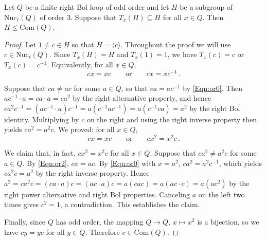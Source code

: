 \documentclass[10pt,a4paper]{amsart}
\newcommand{\com}[1]{\mathrm{Com}(#1)}
\newcommand{\inv}{^{-1}}
\newcommand{\lnuc}[1]{\mathrm{Nuc}_\ell(#1)}
\begin{document}
\begin{lemma}\label{Lem:rnuccomm}
Let $Q$ be a finite right Bol loop of odd order and let $H$ be a subgroup of $\lnuc{Q}$ of order $3$. Suppose that $T_x(H)\subseteq H$ for all $x\in Q$. Then $H\leq \com{Q}$.
\end{lemma}

\begin{proof}
Let $1\ne c\in H$ so that $H = \langle c\rangle$. Throughout the proof we will use $c\in\lnuc{Q}$. Since $T_x(H)=H$ and $T_x(1)=1$, we have $T_x(c) = c$ or $T_x(c) = c\inv$. Equivalently, for all $x\in Q$,
\begin{equation}\label{Eqn:or0}
	cx = xc\qquad\text{or}\qquad cx=xc\inv\,.
\end{equation}

Suppose that $ca\neq ac$ for some $a\in Q$, so that $ca=ac\inv$ by \eqref{Eqn:or0}. Then $ac\inv\cdot a = ca\cdot a = ca^2$ by the right alternative property, and hence $ca^2c\inv = (ac\inv\cdot a)c\inv = a(c\inv ac\inv) = a(c\inv ca) = a^2$ by the right Bol identity. Multiplying by $c$ on the right and using the right inverse property then yields $ca^2=a^2c$. We proved: for all $x\in Q$,
\begin{equation}\label{Eqn:or2}
 	cx = xc \qquad\text{or}\qquad cx^2 = x^2 c\,.
\end{equation}

We claim that, in fact, $cx^2=x^2c$ for all $x\in Q$. Suppose that $ca^2\ne a^2c$ for some $a\in Q$. By \eqref{Eqn:or2}, $ca=ac$. By \eqref{Eqn:or0} with $x=a^2$, $ca^2=a^2c^{-1}$, which yields $ca^2c=a^2$ by the right inverse property. Hence $a^2 = ca^2c = (ca\cdot a)c = (ac\cdot a)c = a(cac) = a(ac\cdot c) = a(ac^2)$ by the right power alternative and right Bol properties. Canceling $a$ on the left two times gives $c^2=1$, a contradiction. This establishes the claim.

Finally, since $Q$ has odd order, the mapping $Q\to Q$, $x\mapsto x^2$ is a bijection, so we have $cy = yc$ for all $y\in Q$. Therefore $c\in \com{Q}$.
\end{proof}
\end{document}
